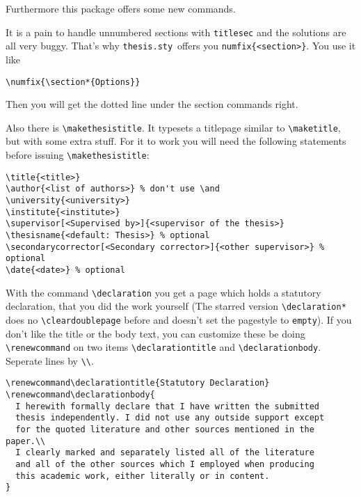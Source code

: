\documentclass[book]{scrbook}
\newcommand\thesis{\texttt{thesis.sty}}
\begin{document}
Furthermore this package offers some new commands.

It is a pain to handle unnumbered sections with \verb|titlesec| and the solutions are all very buggy. That's why \thesis\ offers you \verb|numfix{<section>}|. You use it like
\begin{verbatim}
\numfix{\section*{Options}}
\end{verbatim}
Then you will get the dotted line under the section commands right.

Also there is \verb|\makethesistitle|. It typesets a titlepage similar to \verb|\maketitle|, but with some extra stuff. For it to work you will need the following statements before issuing \verb|\makethesistitle|:
\begin{verbatim}
\title{<title>}
\author{<list of authors>} % don't use \and
\university{<university>}
\institute{<institute>}
\supervisor[<Supervised by>]{<supervisor of the thesis>}
\thesisname{<default: Thesis>} % optional
\secondarycorrector[<Secondary corrector>]{<other supervisor>} % optional
\date{<date>} % optional
\end{verbatim}

With the command \verb|\declaration| you get a page which holds a statutory declaration, that you did the work yourself (The starred version \verb|\declaration*| does no \verb|\cleardoublepage| before and doesn't set the pagestyle to  \verb|empty|). If you don't like the title or the body text, you can customize these be doing \verb|\renewcommand| on two items \verb|\declarationtitle| and \verb|\declarationbody|. Seperate lines by \verb|\\|.
\begin{verbatim}
\renewcommand\declarationtitle{Statutory Declaration}
\renewcommand\declarationbody{
  I herewith formally declare that I have written the submitted
  thesis independently. I did not use any outside support except
  for the quoted literature and other sources mentioned in the paper.\\
  I clearly marked and separately listed all of the literature
  and all of the other sources which I employed when producing
  this academic work, either literally or in content.
}
\end{verbatim}
\end{document}
